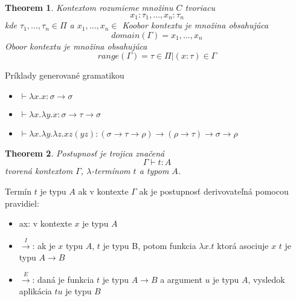\documentclass[a4paper,10pt,oneside]{report}%
\newtheorem{theorem}{Theorem}
\begin{document}
\begin{theorem}
    Kontextom rozumieme množinu $C$ tvoriacu 
    \begin{equation}
        { x_{1} : \tau_{1}, \dots, x_{n} : \tau_{n} }
    \end{equation}
    kde $\tau_{1}, \dots, \tau_{n} \in \Pi$ a $x_{1}, \dots , x_{n} \in$
    Koobor kontextu je množina obsahujúca
    \begin{equation}
        domain(\Gamma) = { x_{1}, \dots, x_{n} }
    \end{equation}
    Oboor kontextu je množina obsahujúca
    \begin{equation}
        range( \Gamma ) = { \tau \in \Pi  | (x : \tau ) \in \Gamma }
    \end{equation}
\end{theorem}

Príklady generované gramatikou
\begin{itemize}
    \item $\vdash \lambda x.x : \sigma \to \sigma$
    \item $\vdash \lambda x. \lambda y.x : \sigma \to \tau \to \sigma$
    \item $\vdash \lambda x. \lambda y. \lambda z.x z (y z): (\sigma \to \tau \to \rho) \to (\rho \to \tau) \to \sigma \to \rho$
\end{itemize}

\begin{theorem}
    Postupnosť je trojica značená
    \begin{equation}
        \Gamma \vdash t : A
    \end{equation}
tvorená kontextom $\Gamma$, $\lambda$-termínom $t$ a typom $A$.
\end{theorem}

Termín $t$ je typu $A$ ak v kontexte $\Gamma$ ak je postupnosť derivovateľná pomocou pravidiel:
\begin{itemize}
    \item ax: v kontexte $x$ je typu $A$
    \item $\overset{I}{\rightarrow}$: ak je $x$ typu $A$, $t$ je typu B, potom
        funkcia $\lambda x.t$ ktorá asociuje $x$ $t$ je typu $A \to B$
    \item $\overset{E}{\rightarrow}$: daná je funkcia $t$ je typu $A \to B$
        a argument $u$ je typu $A$, vysledok aplikácia $t u$ je typu $B$
\end{itemize}
\end{document}
